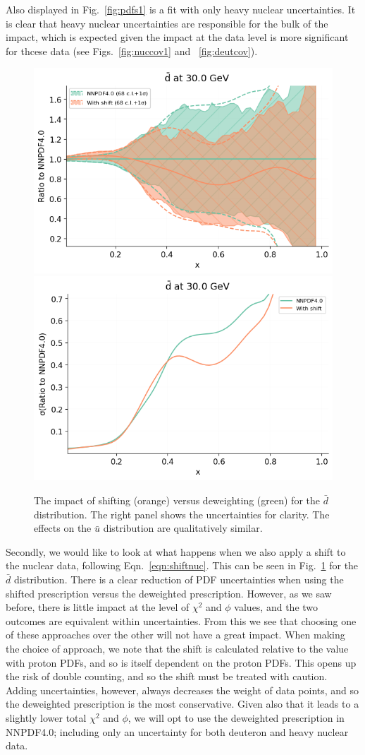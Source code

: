 Also displayed in Fig.~\ref{fig:pdfs1} is a fit with only heavy nuclear uncertainties. It is clear that heavy nuclear uncertainties are responsible for the bulk of the impact, which is expected given the impact at the data level is more significant for thcese data (see Figs.~\ref{fig:nuccov1} and ~\ref{fig:deutcov}).
\begin{figure}[H]
  \begin{center}
      \includegraphics[width=0.49\linewidth]{nuclear/plots/shiftvdw_pdfplot.png}
     \includegraphics[width=0.49\linewidth]{nuclear/plots/shiftvdw_errplot.png}
    \caption{The impact of shifting (orange) versus deweighting (green) for the $\bar{d}$ distribution. The right panel shows the uncertainties for clarity. The effects on the $\bar{u}$ distribution are qualitatively similar. 
    \label{fig:pdfs3} }
    \end{center}
\end{figure}   
Secondly, we would like to look at what happens when we also apply a shift to the nuclear data, following Eqn.~\ref{eqn:shiftnuc}. This can be seen in Fig.~\ref{fig:pdfs3} for the $\bar{d}$ distribution. There is a clear reduction of PDF uncertainties when using the shifted prescription versus the deweighted prescription. However, as we saw before, there is little impact at the level of $\chi^2$ and $\phi$ values, and the two outcomes are equivalent within uncertainties. From this we see that choosing one of these approaches over the other will not have a great impact. When making the choice of approach, we note that the shift is calculated relative to the value with proton PDFs, and so is itself dependent on the proton PDFs. This opens up the risk of double counting, and so the shift must be treated with caution. Adding uncertainties, however, always decreases the weight of data points, and so the deweighted prescription is the most conservative. Given also that it leads to a slightly lower total $\chi^2$ and $\phi$, we will opt to use the deweighted prescription in NNPDF4.0; including only an uncertainty for both deuteron and heavy nuclear data.

